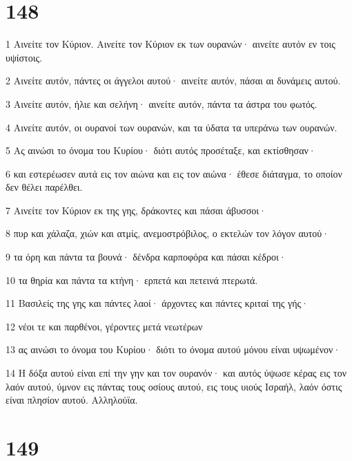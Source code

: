 \chapter{148}

\par 1 Αινείτε τον Κύριον. Αινείτε τον Κύριον εκ των ουρανών· αινείτε αυτόν εν τοις υψίστοις.
\par 2 Αινείτε αυτόν, πάντες οι άγγελοι αυτού· αινείτε αυτόν, πάσαι αι δυνάμεις αυτού.
\par 3 Αινείτε αυτόν, ήλιε και σελήνη· αινείτε αυτόν, πάντα τα άστρα του φωτός.
\par 4 Αινείτε αυτόν, οι ουρανοί των ουρανών, και τα ύδατα τα υπεράνω των ουρανών.
\par 5 Ας αινώσι το όνομα του Κυρίου· διότι αυτός προσέταξε, και εκτίσθησαν·
\par 6 και εστερέωσεν αυτά εις τον αιώνα και εις τον αιώνα· έθεσε διάταγμα, το οποίον δεν θέλει παρέλθει.
\par 7 Αινείτε τον Κύριον εκ της γης, δράκοντες και πάσαι άβυσσοι·
\par 8 πυρ και χάλαζα, χιών και ατμίς, ανεμοστρόβιλος, ο εκτελών τον λόγον αυτού·
\par 9 τα όρη και πάντα τα βουνά· δένδρα καρποφόρα και πάσαι κέδροι·
\par 10 τα θηρία και πάντα τα κτήνη· ερπετά και πετεινά πτερωτά.
\par 11 Βασιλείς της γης και πάντες λαοί· άρχοντες και πάντες κριταί της γής·
\par 12 νέοι τε και παρθένοι, γέροντες μετά νεωτέρων
\par 13 ας αινώσι το όνομα του Κυρίου· διότι το όνομα αυτού μόνου είναι υψωμένον·
\par 14 Η δόξα αυτού είναι επί την γην και τον ουρανόν· και αυτός ύψωσε κέρας εις τον λαόν αυτού, ύμνον εις πάντας τους οσίους αυτού, εις τους υιούς Ισραήλ, λαόν όστις είναι πλησίον αυτού. Αλληλούϊα.

\chapter{149}

